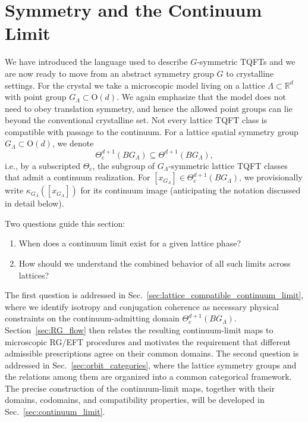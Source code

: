 \documentclass[aps,prx,reprint,superscriptaddress,twocolumn,amsmath,amssymb,amsfonts, nofootinbib]{revtex4-2}
\theoremstyle{apsstyle}
\begin{document}
\section{Symmetry and the Continuum Limit}
\label{sec:motivation}

\smallskip

We have introduced the language used to describe $G$-symmetric TQFTs and we are now ready to move from an abstract symmetry group $G$ to crystalline settings. For the crystal we take a microscopic model living on a lattice $\Lambda\subset \mathbb{R}^{d}$ with point group $G_{\Lambda}\subset \mathrm{O}(d)$. We again emphasize that the model does not need to obey translation symmetry, and hence the allowed point groups can lie beyond the conventional crystalline set. Not every lattice TQFT class is compatible with passage to the continuum. For a lattice spatial symmetry group $G_{\Lambda}\subset \mathrm{O}(d)$, we denote  \begin{equation*} \Theta_{\mathrm c}^{d+1}(BG_{\Lambda}) \subseteq \Theta^{d+1}(BG_{\Lambda}), \end{equation*} i.e., by a subscripted $\Theta_c$, the subgroup of $G_{\Lambda}$-symmetric lattice TQFT classes that admit a continuum realization. For $[x_{G_{\Lambda}}]\in\Theta_{\mathrm c}^{d+1}(BG_{\Lambda})$, we provisionally write $\kappa_{G_{\Lambda}}([x_{G_{\Lambda}}])$ for its continuum image (anticipating the notation discussed in detail below). 

\noindent Two questions guide this section:
\begin{enumerate}
\item When does a continuum limit exist for a given lattice phase? 
\item How should we understand the combined behavior of all such limits across lattices?
\end{enumerate}
The first question is addressed in Sec.~\ref{sec:lattice_compatible_continuum_limit}, where we identify isotropy and conjugation coherence as necessary physical constraints on the continuum-admitting domain $\Theta_{\mathrm c}^{d+1}(BG_{\Lambda})$. Section~\ref{sec:RG_flow} then relates the resulting continuum-limit maps to microscopic RG/EFT procedures and motivates the requirement that different admissible prescriptions agree on their common domains. The second question is addressed in Sec.~\ref{sec:orbit_categories}, where the lattice symmetry groups and the relations among them are organized into a common categorical framework. The precise construction of the continuum-limit maps, together with their domains, codomains, and compatibility properties, will be developed in Sec.~\ref{sec:continuum_limit}.
\end{document}
